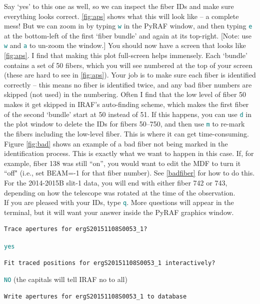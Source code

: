 \documentclass[12pt]{report}
\newcommand{\ty}[1]{\textcolor{teal}{\texttt{#1}}}
\begin{document}
\begin{enumerate}
Say `yes' to this one as well, so we can inspect the fiber IDs and make sure everything looks correct. \autoref{fig:aps} shows what this will look like -- a complete mess! But we can zoom in by typing \ty{w} in the PyRAF window, and then typing \ty{e} at the bottom-left of the first `fiber bundle' and again at its top-right. [Note: use \ty{w} and \ty{a} to un-zoom the window.] You should now have a screen that looks like \autoref{fig:aps}. I find that making this plot full-screen helps immensely. Each `bundle' contains a set of 50 fibers, which you will see numbered at the top of your screen (these are hard to see in \autoref{fig:aps}). Your job is to make sure each fiber is identified correctly -- this means no fiber is identified twice, and any bad fiber numbers are skipped (not used) in the numbering. Often I find that the low level of fiber 50 makes it get skipped in IRAF's auto-finding scheme, which makes the first fiber of the second `bundle' start at 50 instead of 51. If this happens, you can use \ty{d} in the plot window to delete the IDs for fibers 50--750, and then use \ty{m} to re-mark the fibers including the low-level fiber. This is where it can get time-consuming. \\

Figure \autoref{fig:bad} shows an example of a bad fiber not being marked in the identification process. This is exactly what we want to happen in this case. If, for example, fiber 138 was still ``on'', you would want to edit the MDF to turn it ``off" (i.e., set BEAM=-1 for that fiber number). See \autoref{badfiber} for how to do this. For the 2014-2015B slit-1 data, you will end with either fiber 742 or 743, depending on how the telescope was rotated at the time of the observation. \\

If you are pleased with your IDs, type \ty{q}. More questions will appear in the terminal, but it will want your answer inside the PyRAF graphics window.

\begin{verbatim}
Trace apertures for ergS20151108S0053_1? 
\end{verbatim}

\ty{yes}

\begin{verbatim}
Fit traced positions for ergS20151108S0053_1 interactively?
\end{verbatim}

\ty{NO} (the capitals will tell IRAF no to all)

\begin{verbatim}
Write apertures for ergS20151108S0053_1 to database
\end{verbatim}


\end{enumerate}
\end{document}
